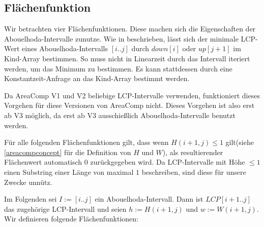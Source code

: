 \subsection{Flächenfunktion}

Wir betrachten vier Flächenfunktionen. Diese machen sich die Eigenschaften der \\
Abouelhoda-Intervalle zunutze. 
Wie in \cite{abouelhoda_optimal_2002} beschrieben, lässt sich der minimale LCP-Wert eines Abouelhoda-Intervalls $[i..j]$ durch $down[i]$ oder $up[j+1]$ im Kind-Array bestimmen. 
So muss nicht in Linearzeit durch das Intervall iteriert werden, um das Minimum zu bestimmen. Es kann stattdessen durch eine Konstantzeit-Anfrage an das Kind-Array bestimmt werden. 

Da AreaComp V1 und V2 beliebige LCP-Intervalle verwenden, funktioniert dieses Vorgehen für diese Versionen von AreaComp nicht. Dieses Vorgehen ist also erst ab V3 möglich, da erst ab V3 ausschießlich Abouelhoda-Intervalle benutzt werden.

Für alle folgenden Flächenfunktionen gilt, dass wenn $H(i+1, j) \leq 1$ gilt(siehe \autoref{areacompconcept} für die Definition von $H$ und $W$), als resultierender Flächenwert automatisch $0$ zurückgegeben wird. Da LCP-Intervalle mit Höhe $\leq 1$ einen Substring einer Länge von maximal $1$ beschreiben, sind diese für unsere Zwecke unnütz.  

Im Folgenden sei $I := [i..j]$ ein Abouelhoda-Intervall. Dann ist $LCP[i+1..j]$ das zugehörige LCP-Intervall und seien $h := H(i+1, j)$ und $w := W(i+1, j)$. Wir definieren folgende Flächenfunktionen:

